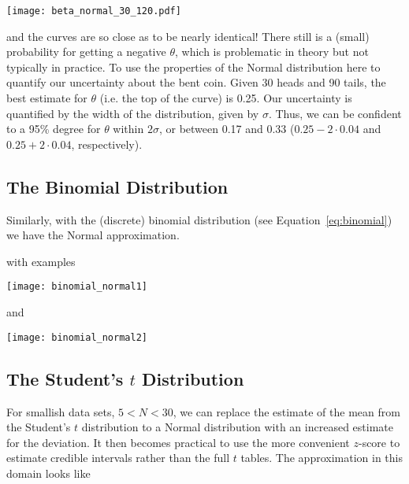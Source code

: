 \texttt{[image: beta\_normal\_30\_120.pdf]}

and the curves are so close as to be nearly identical!  There still is a (small) probability for getting a negative $\theta$, which is problematic in theory but not typically in practice.  To use the properties of the Normal distribution here to quantify our uncertainty about the bent coin.  Given 30 heads and 90 tails, the best estimate for $\theta$ (i.e. the top of the curve) is 0.25.  Our uncertainty is quantified by the width of the distribution, given by $\sigma$.  Thus, we can be confident to a 95\% degree for $\theta$ within $2\sigma$, or between 0.17 and 0.33 ($0.25-2\cdot 0.04$ and $0.25+2\cdot 0.04$, respectively).


\subsection{The Binomial Distribution}

Similarly, with the (discrete) binomial distribution (see Equation~\ref{eq:binomial}) we have the Normal approximation.


with examples

\texttt{[image: binomial\_normal1]}

and

\texttt{[image: binomial\_normal2]}

\subsection{The Student's $t$ Distribution}\label{sec:normal_t_approx}

For smallish data sets, $5<N<30$, we can replace the estimate of the mean from the Student's $t$ distribution to a Normal distribution with an increased estimate for the deviation.  It then becomes practical to use the more convenient $z$-score to estimate credible intervals rather than the full $t$ tables.  The approximation in this domain looks like\cite{berry1996statistics}

